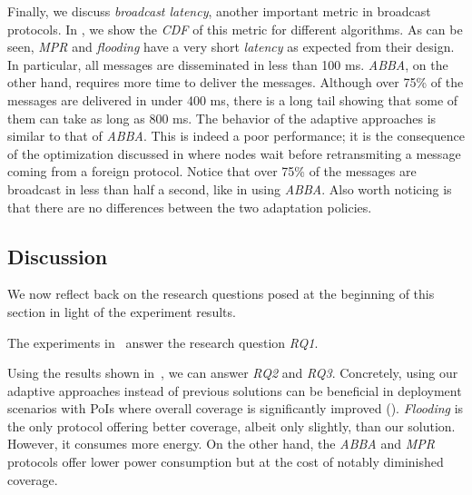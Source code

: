 Finally, we discuss \textit{broadcast latency}, another important metric in broadcast protocols.
%
In , we show the \textit{CDF} of this metric for different algorithms.
%
As can be seen, \textit{MPR} and \textit{flooding} have a very short \textit{latency} as expected from their design.
%
In particular, all messages are disseminated in less than 100 ms.
%
\textit{ABBA}, on the other hand, requires more time to deliver the messages.
%
Although over 75\% of the messages are delivered in under 400 ms, there is a long tail showing that some of them can take as long as 800 ms.
%
The behavior of the adaptive approaches is similar to that of \textit{ABBA}.
%
This is indeed a poor performance; it is the consequence of the optimization discussed in  where nodes wait before retransmiting a message coming from a foreign protocol.
%
Notice that over 75\% of the messages are broadcast in less than half a second, like in using \textit{ABBA}.
%
Also worth noticing is that there are no differences between the two adaptation policies.



\subsection{Discussion}


We now reflect back on the research questions posed at the beginning of this section in light of the experiment results. 

The experiments in~ answer the research question \textit{RQ1}. 

Using the results shown in~, we can answer \textit{RQ2} and \textit{RQ3}. 
Concretely, using our adaptive approaches instead of previous solutions can be beneficial in deployment scenarios with PoIs where overall coverage is significantly improved (). 
%
%
\textit{Flooding} is the only protocol offering better coverage, albeit only slightly, than our solution. However, it consumes more energy. 
%
On the other hand, the \textit{ABBA} and \textit{MPR} protocols offer lower power consumption but at the cost of notably diminished coverage.
%
%

